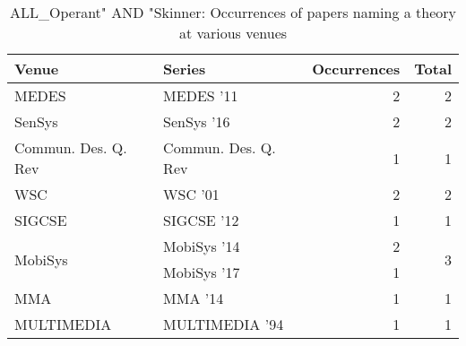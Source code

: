 \begin{table*}[t]
\begin{tabular}{llrr}
Venue & Series & Occurrences & Total\\\hline
\multirow{1}{*}{MEDES } & MEDES '11 & 2 & \multirow{1}{*}{2}\\
\multirow{1}{*}{SenSys } & SenSys '16 & 2 & \multirow{1}{*}{2}\\
\multirow{1}{*}{Commun. Des. Q. Rev} & Commun. Des. Q. Rev & 1 & \multirow{1}{*}{1}\\
\multirow{1}{*}{WSC } & WSC '01 & 2 & \multirow{1}{*}{2}\\
\multirow{1}{*}{SIGCSE } & SIGCSE '12 & 1 & \multirow{1}{*}{1}\\
\multirow{2}{*}{MobiSys } & MobiSys '14 & 2 & \multirow{2}{*}{3}\\
& MobiSys '17 & 1 &\\
\multirow{1}{*}{MMA } & MMA '14 & 1 & \multirow{1}{*}{1}\\
\multirow{1}{*}{MULTIMEDIA } & MULTIMEDIA '94 & 1 & \multirow{1}{*}{1}\\
\end{tabular}
\caption{ALL\_Operant" AND "Skinner: Occurrences of papers naming a theory at various venues}
\end{table*}